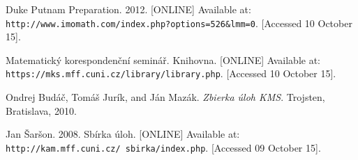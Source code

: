 \documentclass[11pt,a5paper]{article}
\begin{document}
\begin{thebibliography}{9}
 Duke Putnam Preparation. 2012. [ONLINE] Available at: \texttt{http://www.imomath.com/index.php?options=526\&lmm=0}. [Accessed 10 October 15].

 Matematický korespondenční seminář. Knihovna. [ONLINE] Available at: \texttt{https://mks.mff.cuni.cz/library/library.php}. [Accessed 10 October 15].

 Ondrej Budáč, Tomáš Jurík, and Ján Mazák. \emph{Zbierka úloh KMS}. Trojsten, Bratislava, 2010.

 Jan Šaršon. 2008. Sbírka úloh. [ONLINE] Available at: \texttt{http://kam.mff.cuni.cz/~sbirka/index.php}. [Accessed 09 October 15].
\end{thebibliography}
\end{document}
